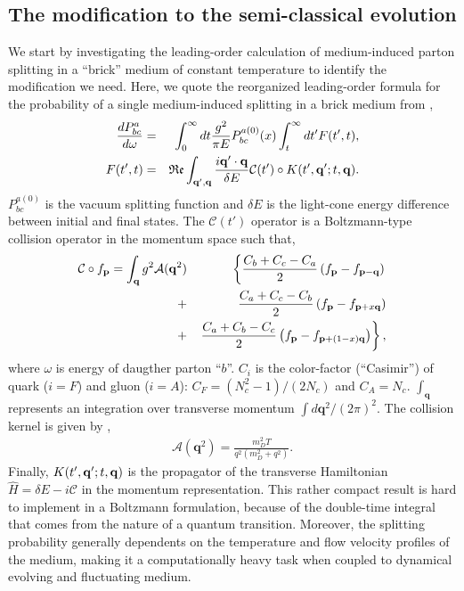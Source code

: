 \documentclass[aps, prc, reprint, amsmath, groupedaddress, nofootinbib]{revtex4-1}
\begin{document}
\subsection{The modification to the semi-classical evolution}
We start by investigating the leading-order calculation of medium-induced parton splitting in a ``brick'' medium of constant temperature to identify the modification we need.
Here, we quote the reorganized leading-order formula for the probability of a single medium-induced splitting in a brick medium from \cite{Zakharov:1996fv,CaronHuot:2010bp},
\begin{eqnarray}
\frac{dP^{a}_{bc}}{d\omega} &=& \int_0^\infty dt \frac{g^2}{\pi E} P_{bc}^{a(0)}(x) \int_t^\infty dt'  F(t', t),
\label{eq:full-theory}
\\
F(t', t) &=& \mathfrak{Re} \int_{{\bf q}', {\bf q}} \frac{i {\bf q}'\cdot {\bf q}}{\delta E} \mathcal{C}(t') \circ K(t', {\bf q}'; t, {\bf q}).
\end{eqnarray}
$P_{bc}^{a(0)}$ is the vacuum splitting function and $\delta E$ is the light-cone energy difference between initial and final states. 
The $\mathcal{C}(t')$ operator is a Boltzmann-type collision operator in the momentum space such that,
\begin{eqnarray}
\label{eq:Boltzmann-like-operator}
\mathcal{C}\circ f_{\mathbf{p}} = \int_{\bf q} g^2\mathcal{A}(\mathbf{q}^2)
&&\left\{  \frac{C_b+C_c-C_a}{2}\left(f_{\bf p}-f_{{\bf p}-{\bf q}}\right) \right.\\\nonumber
 +&&    \frac{C_a+C_c-C_b}{2}\left(f_{\bf p}-f_{{\bf p}+x{\bf q}}\right) \\\nonumber
+&&  \left. \frac{C_a+C_b-C_c}{2}\left(f_{\bf p}-f_{{\bf p}+(1-x){\bf q}}\right)\right\},
\end{eqnarray}
where $\omega$ is energy of daugther parton ``$b$''.
$C_i$ is the color-factor (``Casimir'') of quark ($i=F$) and gluon ($i=A$): $C_F = (N_c^2-1)/(2N_c)$ and $C_A = N_c$. 
$\int_{\mathbf{q}}$ represents an integration over transverse momentum $\int d\mathbf{q}^2/(2\pi)^2$.
The collision kernel is given by \cite{Aurenche:2002pd},
\begin{eqnarray}
\mathcal{A}(\mathbf{q}^2) = \frac{m_D^2 T}{q^2\left(m_D^2+q^2\right)}.
\label{eq:kernel}
\end{eqnarray}
Finally, $K(t', {\bf q}'; t, {\bf q})$ is the propagator of the transverse  Hamiltonian $\hat{H} = \delta E - i\mathcal{C}$ in the momentum representation.
This rather compact result is hard to implement in a Boltzmann formulation, because of the double-time integral that comes from the nature of a quantum transition.
Moreover, the splitting probability generally dependents on the temperature and flow velocity profiles of the medium, making it a computationally heavy task when coupled to dynamical evolving and fluctuating medium.
\end{document}
